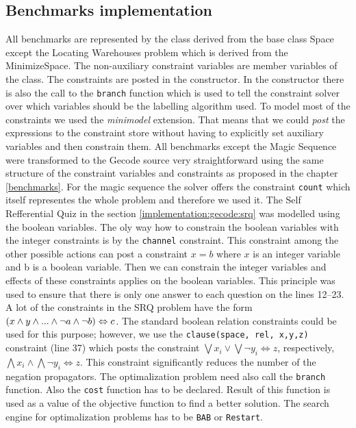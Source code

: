 \subsection{Benchmarks implementation}
All benchmarks are represented by the class derived from the base class Space except the
Locating Warehouses problem which is derived from the MinimizeSpace. The non-auxiliary
 constraint variables are member variables of the class. The constraints are posted in the 
 constructor. In the constructor there is also the call to the \texttt{branch} function which
 is used to tell the constraint solver over which variables should be the labelling algorithm
 used. To model most of the constraints we used the {\em minimodel} extension. That means that we could {\em post} the expressions
to the constraint store without having to explicitly set auxiliary variables and then
constrain them. All benchmarks except the Magic Sequence were transformed to the 
Gecode source very straightforward using the same structure of the constraint variables
and constraints as proposed in the chapter \ref{benchmarks}. For the magic sequence 
the solver offers the constraint \texttt{count} which itself representes the whole 
problem and therefore we used it. The Self Refferential Quiz in the section \ref{implementation:gecode:srq} 
was modelled using the boolean variables. The oly way how to constrain the boolean variables with
the integer constraints is by the \texttt{channel} constraint. This constraint among
the other possible actions can post a constraint $x = b$ where $x$ is an integer variable
and b is a boolean variable. Then we can constrain the integer variables and effects of 
these constraints applies on the boolean variables. This principle was used to ensure
that there is only one answer to each question on the lines 12--23. A lot of the
constraints in the SRQ problem have the form $(x \wedge y \wedge ... \wedge \neg a \wedge \neg b) \Leftrightarrow c$.
The standard boolean relation constraints could be used for this purpose; however, we use 
the \texttt{clause(space, rel, x,y,z)} constraint (line 37) which posts the constraint 
 $\bigvee {x_i} \vee \bigvee{\neg y_i} \Leftrightarrow z$, respectively, $\bigwedge {x_i} \wedge \bigwedge{\neg y_i} \Leftrightarrow z$.
 This constraint significantly reduces the number of the negation propagators.
 The optimalization problem need also call the \texttt{branch} function. Also the
 \texttt{cost} function has to be declared. Result of this function is used as a value of
 the objective function to find a better solution. The search engine for optimalization
 problems has to be \texttt{BAB} or \texttt{Restart}.
   

